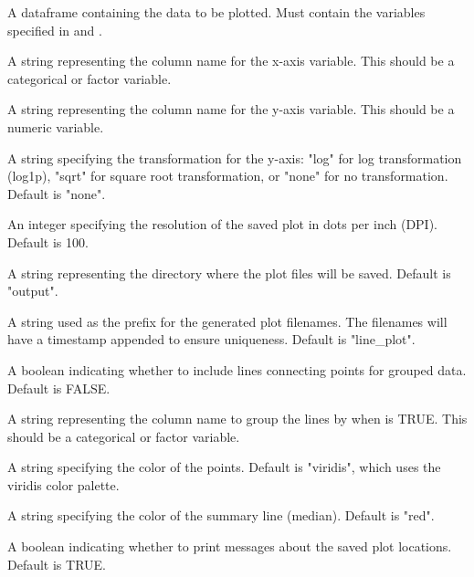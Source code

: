 \documentclass[a4paper]{book}
\begin{document}
\begin{Arguments}
\begin{ldescription}
\item[\code{data}] A dataframe containing the data to be plotted. Must contain the variables specified in  and .

\item[\code{x\_var}] A string representing the column name for the x-axis variable. This should be a categorical or factor variable.

\item[\code{y\_var}] A string representing the column name for the y-axis variable. This should be a numeric variable.

\item[\code{y\_transform}] A string specifying the transformation for the y-axis: "log" for log transformation (log1p), "sqrt" for square root transformation, or "none" for no transformation. Default is "none".

\item[\code{dpi}] An integer specifying the resolution of the saved plot in dots per inch (DPI). Default is 100.

\item[\code{output\_dir}] A string representing the directory where the plot files will be saved. Default is "output".

\item[\code{file\_prefix}] A string used as the prefix for the generated plot filenames. The filenames will have a timestamp appended to ensure uniqueness. Default is "line\_plot".

\item[\code{use\_geom\_line}] A boolean indicating whether to include lines connecting points for grouped data. Default is FALSE.

\item[\code{geom\_line\_group}] A string representing the column name to group the lines by when  is TRUE. This should be a categorical or factor variable.

\item[\code{point\_color}] A string specifying the color of the points. Default is "viridis", which uses the viridis color palette.

\item[\code{line\_color}] A string specifying the color of the summary line (median). Default is "red".

\item[\code{verbose}] A boolean indicating whether to print messages about the saved plot locations. Default is TRUE.
\end{ldescription}
\end{Arguments}
\end{document}
